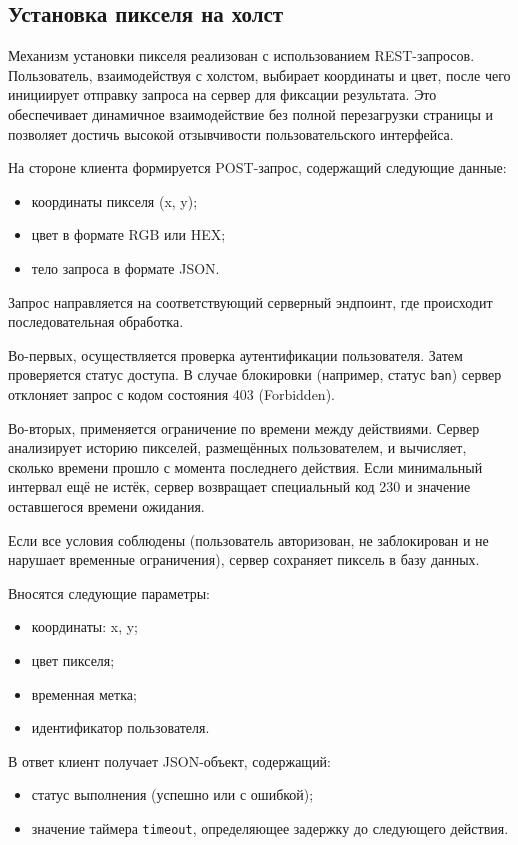 \subsection{Установка пикселя на холст}

Механизм установки пикселя реализован с использованием REST-запросов. Пользователь, взаимодействуя с холстом, выбирает координаты и цвет, после чего инициирует отправку запроса на сервер для фиксации результата. Это обеспечивает динамичное взаимодействие без полной перезагрузки страницы и позволяет достичь высокой отзывчивости пользовательского интерфейса.

На стороне клиента формируется POST-запрос, содержащий следующие данные:
\begin{itemize}
    \item координаты пикселя (x, y);
    \item цвет в формате RGB или HEX;
    \item тело запроса в формате JSON.
\end{itemize}

Запрос направляется на соответствующий серверный эндпоинт, где происходит последовательная обработка.

Во-первых, осуществляется проверка аутентификации пользователя. Затем проверяется статус доступа. В случае блокировки (например, статус \texttt{ban}) сервер отклоняет запрос с кодом состояния 403 (Forbidden).

Во-вторых, применяется ограничение по времени между действиями. Сервер анализирует историю пикселей, размещённых пользователем, и вычисляет, сколько времени прошло с момента последнего действия. Если минимальный интервал ещё не истёк, сервер возвращает специальный код 230 и значение оставшегося времени ожидания.

Если все условия соблюдены (пользователь авторизован, не заблокирован и не нарушает временные ограничения), сервер сохраняет пиксель в базу данных.

Вносятся следующие параметры:
\begin{itemize}
    \item координаты: x, y;
    \item цвет пикселя;
    \item временная метка;
    \item идентификатор пользователя.
\end{itemize}

В ответ клиент получает JSON-объект, содержащий:
\begin{itemize}
    \item статус выполнения (успешно или с ошибкой);
    \item значение таймера \texttt{timeout}, определяющее задержку до следующего действия.
\end{itemize}

